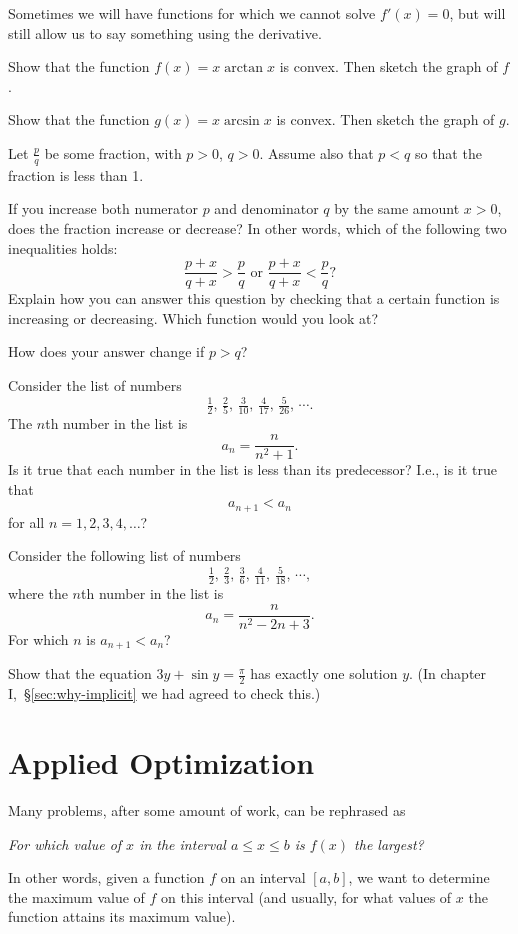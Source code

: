 \begin{multicols}{2}
\bigskip


\problem Sometimes we will have functions for which we cannot solve $f'(x)=0$, %
but will still allow us to say something using the derivative.




\subprob Show that the function $f(x) = x\arctan x$ is convex.  Then
sketch the graph of $f$.




\subprob Show that the function $g(x) = x\arcsin x$ is convex.  Then
sketch the graph of $g$.


\problem  Let $\frac pq$ be some fraction, with $p>0$, $q>0$. %
Assume also that $p<q$ so that the fraction is less than 1.

If you increase both numerator $p$ and denominator $q$ by the same amount
$x>0$, does the fraction increase or decrease?  In other words, which of the
following two inequalities holds:
\[
  \frac{p+x}{q+x} > \frac{p}{q}
  \text{ or }
  \frac{p+x}{q+x} < \frac{p}{q}?
\]
Explain how you can answer this question by checking that a certain
function is increasing or decreasing.  Which function would you look
at?

How does your answer change if $p>q$?




\problem\subprob Consider the list of numbers %
\[
\tfrac{1} {2},\,
\tfrac{2} {5},\,
\tfrac{3} {10},\,
\tfrac{4} {17},\,
\tfrac{5} {26},\,
\cdots.
\]
The $n$th number in the list is
\[
a_n = \frac{n} {n^2+1}.
\]
Is it true that each number in the list is less than its predecessor?  I.e., is
it true that
\[
a_{n+1} < a_n
\]
for all $n=1, 2, 3, 4, \ldots$?




\subprob Consider the following list of numbers
\[
\tfrac{1} {2},\,
\tfrac{2} {3},\,
\tfrac{3} {6},\,
\tfrac{4} {11},\,
\tfrac{5} {18},\,
\cdots,
\]
where the $n$th number in the list is
\[
a_n = \frac{n} {n^2-2n+3}.
\]
For which $n$ is $a_{n+1} < a_n$?




\problem  \label{ex:implicit-from-ch1} %
Show that the equation $3y+\sin y = \frac\pi2$ has exactly
one solution $y$.  (In chapter I,~\S\ref{sec:why-implicit} we had agreed to
check this.)
\end{multicols}
\noproblemfont


\section{Applied Optimization} %
Many problems, after some amount of work, can be rephrased as
\begin{center}
  \textit{For which value of $x$ in the interval $a\leq x\leq b$ is $f(x)$ the
    largest?}
\end{center}
In other words, given a function $f$ on an interval $[a, b]$, we want to determine the maximum value of $f$ on this interval (and usually, for what values of $x$ the function attains its maximum value).




